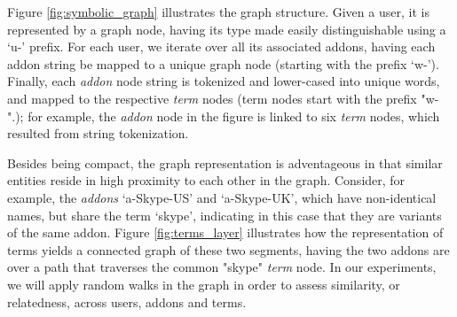 \documentclass[ijoc,nonblindrev]{informs3} %
\numberwithin{equation}{subsection}
\begin{document}
Figure \ref{fig:symbolic_graph} illustrates the graph structure. Given a user, it is represented by a graph node, having its type made easily distinguishable using a `u-' prefix. For each user, we iterate over all its associated addons, having each addon string be mapped to a unique graph node (starting with the prefix `w-'). Finally, each {\it addon} node string is tokenized and lower-cased into unique words, and mapped to the respective {\it term} nodes (term nodes start with the prefix "w-".); for example, the {\it addon} node in the figure is linked to six {\it term} nodes, which resulted from string tokenization.

  
Besides being compact, the graph representation is adventageous in that similar entities reside in high proximity to each other in the graph. Consider, for example, the {\it addons} `a-Skype-US' and `a-Skype-UK', which have non-identical names, but share the term `skype', indicating in this case that they are variants of the same addon. Figure \ref{fig:terms_layer} illustrates how the representation of terms yields a connected graph of these two segments, having  the two addons are over a path that traverses the common "skype" {\it term} node. In our experiments, we will apply random walks in the graph in order to assess similarity, or relatedness, across users, addons and terms.  
\end{document}
